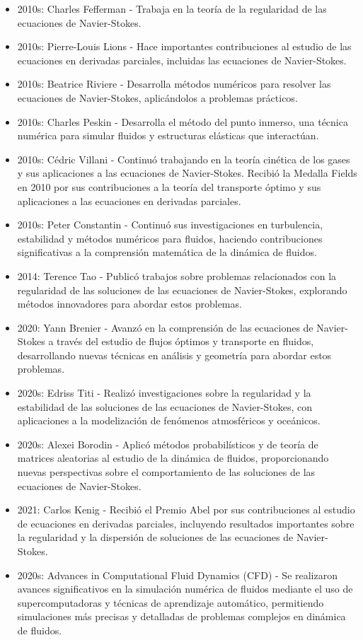 \begin{itemize}
    \item 2010s: Charles Fefferman - Trabaja en la teoría de la regularidad de las ecuaciones de Navier-Stokes.
    \item 2010s: Pierre-Louis Lions - Hace importantes contribuciones al estudio de las ecuaciones en derivadas parciales, incluidas las ecuaciones de Navier-Stokes.
    \item 2010s: Beatrice Riviere - Desarrolla métodos numéricos para resolver las ecuaciones de Navier-Stokes, aplicándolos a problemas prácticos.
    \item 2010s: Charles Peskin - Desarrolla el método del punto inmerso, una técnica numérica para simular fluidos y estructuras elásticas que interactúan.
    \item 2010s: Cédric Villani - Continuó trabajando en la teoría cinética de los gases y sus aplicaciones a las ecuaciones de Navier-Stokes. Recibió la Medalla Fields en 2010 por sus contribuciones a la teoría del transporte óptimo y sus aplicaciones a las ecuaciones en derivadas parciales.
    \item 2010s: Peter Constantin - Continuó sus investigaciones en turbulencia, estabilidad y métodos numéricos para fluidos, haciendo contribuciones significativas a la comprensión matemática de la dinámica de fluidos.
    \item 2014: Terence Tao - Publicó trabajos sobre problemas relacionados con la regularidad de las soluciones de las ecuaciones de Navier-Stokes, explorando métodos innovadores para abordar estos problemas.
    \item 2020: Yann Brenier - Avanzó en la comprensión de las ecuaciones de Navier-Stokes a través del estudio de flujos óptimos y transporte en fluidos, desarrollando nuevas técnicas en análisis y geometría para abordar estos problemas.
    \item 2020s: Edriss Titi - Realizó investigaciones sobre la regularidad y la estabilidad de las soluciones de las ecuaciones de Navier-Stokes, con aplicaciones a la modelización de fenómenos atmosféricos y oceánicos.
    \item 2020s: Alexei Borodin - Aplicó métodos probabilísticos y de teoría de matrices aleatorias al estudio de la dinámica de fluidos, proporcionando nuevas perspectivas sobre el comportamiento de las soluciones de las ecuaciones de Navier-Stokes.
    \item 2021: Carlos Kenig - Recibió el Premio Abel por sus contribuciones al estudio de ecuaciones en derivadas parciales, incluyendo resultados importantes sobre la regularidad y la dispersión de soluciones de las ecuaciones de Navier-Stokes.
    \item 2020s: Advances in Computational Fluid Dynamics (CFD) - Se realizaron avances significativos en la simulación numérica de fluidos mediante el uso de supercomputadoras y técnicas de aprendizaje automático, permitiendo simulaciones más precisas y detalladas de problemas complejos en dinámica de fluidos.
\end{itemize}

